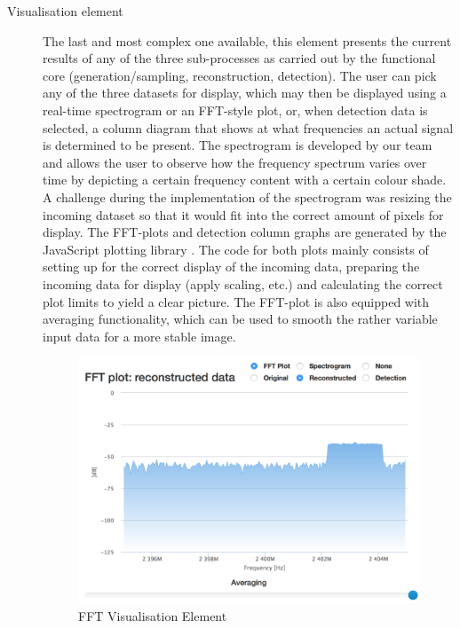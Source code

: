 \documentclass[a4paper, openany, oneside]{memoir}
\begin{document}
\begin{description}
	\item[Visualisation element]
	The last and most complex one available, this element presents the current results of any of the three sub-processes as carried out by the functional core (generation/sampling, reconstruction, detection). The user can pick any of the three datasets for display, which may then be displayed using a real-time spectrogram or an FFT-style plot, or, when detection data is selected, a column diagram that shows at what frequencies an actual signal is determined to be present.
	The spectrogram is developed by our team and allows the user to observe how the frequency spectrum varies over time by depicting a certain frequency content with a certain colour shade. A challenge during the implementation of the spectrogram was resizing the incoming dataset so that it would fit into the correct amount of pixels for display.
	The FFT-plots and detection column graphs are generated by the JavaScript plotting library . The code for both plots mainly consists of setting up  for the correct display of the incoming data, preparing the incoming data for display (apply scaling, etc.) and calculating the correct plot limits to yield a clear picture.
	The FFT-plot is also equipped with averaging functionality, which can be used to smooth the rather variable input data for a more stable image.

\begin{figure}[H]
    \centering
    \includegraphics[width=\textwidth]{figures/fft.png}
    \caption{FFT Visualisation Element}
    \label{fig:fft_element}
\end{figure}


\end{description}
\end{document}
